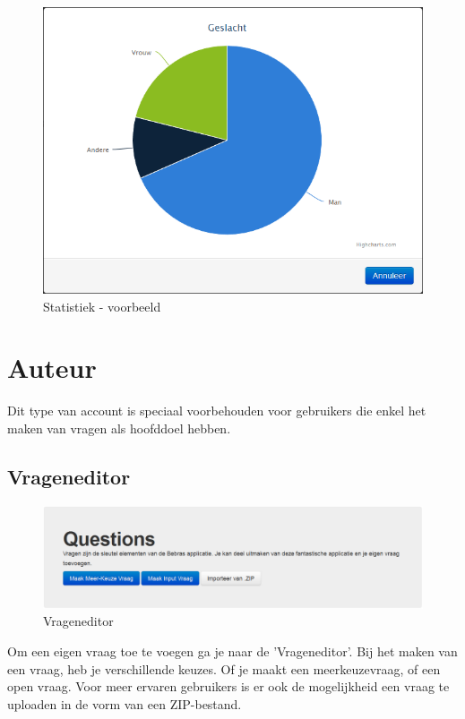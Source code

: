 \documentclass[]{article}
\begin{document}
\begin{figure}[!ht]
	\centering
	\includegraphics[width=1\textwidth]{img/chart}
	\caption{Statistiek - voorbeeld}
	\label{chart}
\end{figure}

\section{Auteur}

Dit type van account is speciaal voorbehouden voor gebruikers die enkel het maken van vragen als hoofddoel hebben.

\subsection{Vrageneditor}

\begin{figure}[!ht]
	\centering
	\includegraphics[width=1\textwidth]{img/questioneditor}
	\caption{Vrageneditor}
	\label{questioneditor}
\end{figure}

Om een eigen vraag toe te voegen ga je naar de 'Vrageneditor'. Bij het maken van een vraag, heb je verschillende keuzes. Of je maakt een meerkeuzevraag, of een open vraag. Voor meer ervaren gebruikers is er ook de mogelijkheid een vraag te uploaden in de vorm van een ZIP-bestand.
\end{document}
